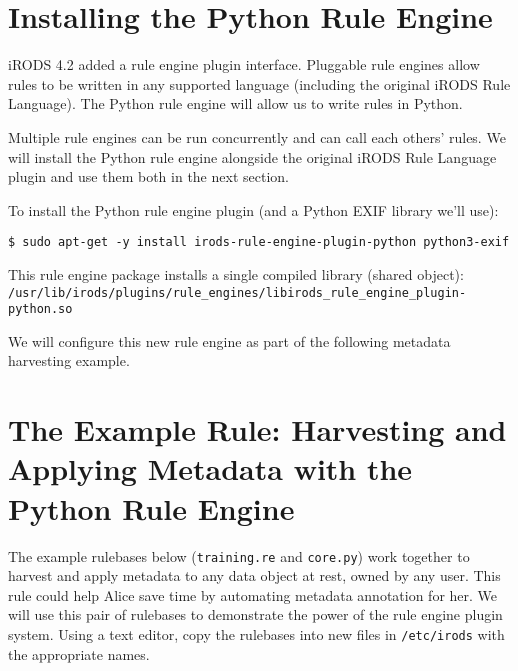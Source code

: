 \documentclass[10pt,oneside]{memoir}
\begin{document}
\section{Installing the Python Rule Engine}

iRODS 4.2 added a rule engine plugin interface.  Pluggable rule engines allow rules to be written in any supported language (including the original iRODS Rule Language).  The Python rule engine will allow us to write rules in Python.

Multiple rule engines can be run concurrently and can call each others' rules.  We will install the Python rule engine alongside the original iRODS Rule Language plugin and use them both in the next section.

To install the Python rule engine plugin (and a Python EXIF library we'll use):

\begin{lstlisting}
$ sudo apt-get -y install irods-rule-engine-plugin-python python3-exif
\end{lstlisting}

This rule engine package installs a single compiled library (shared object): \\ \texttt{/usr/lib/irods/plugins/rule\_engines/libirods\_rule\_engine\_plugin-python.so}

We will configure this new rule engine as part of the following metadata harvesting example.

\section{The Example Rule: Harvesting and Applying Metadata with the Python Rule Engine}

The example rulebases below (\texttt{training.re} and \texttt{core.py}) work together to harvest and apply metadata to any data object at rest, owned by any user. This rule could help Alice save time by automating metadata annotation for her. We will use this pair of rulebases to demonstrate the power of the rule engine plugin system. Using a text editor, copy the rulebases into new files in \texttt{/etc/irods} with the appropriate names.

\vspace{5mm}
\begin{lrbox}{\lstTrainingRuleBase}

\end{lrbox}
\href{https://raw.githubusercontent.com/irods/irods_training/ugm2024/beginner/training.re}{\usebox{\lstTrainingRuleBase}}
\end{document}
